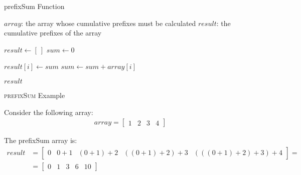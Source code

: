         \begin{frame}[containsverbatim]{\prefixsumfunctionframe}
            \begingroup
                \makeatletter
                \renewcommand{\alglinenumber}[1]{\scriptsize#1}
                \makeatother
                \begin{algorithm}[H]
                    \scriptsize
                    \caption{prefixSum Function} \label{prefixSum function}
                    \begin{algorithmic}[1]
                        \Require 
                            \Statex $array$: the array whose cumulative prefixes must be calculated
                        \Ensure
                            \Statex $result$: the cumulative prefixes of the array
                        \Statex
        
                            \State $result \gets \left[\ \right]$
                            \State $sum \gets 0$
        
                                \State $result{\left[i\right]} \gets sum$
                                \State $sum \gets sum + array{\left[i\right]}$
                            \EndFor
        
                            \State \Return $result$
                        \EndFunction
                    \end{algorithmic}
                \end{algorithm}
            \endgroup
        \end{frame}

        \begin{frame}{\textsc{prefixSum} Example}
            \begin{example}

                Consider the following array:
                \begin{align*}
                    array = \begin{bmatrix}
                        1 & 2 & 3 & 4
                    \end{bmatrix}
                \end{align*}

                The prefixSum array is:
                \begin{align*}
                    result & = \begin{bmatrix}
                        0 & 0 + 1 & \left(0 + 1\right) + 2 & \left(\left(0 + 1\right) + 2\right) + 3 & \left(\left(\left(0 + 1\right) + 2\right) + 3\right) + 4
                    \end{bmatrix} = \\
                    & = \begin{bmatrix}
                        0 & 1 & 3 & 6 & 10
                    \end{bmatrix}
                \end{align*}
            \end{example}
        \end{frame}

